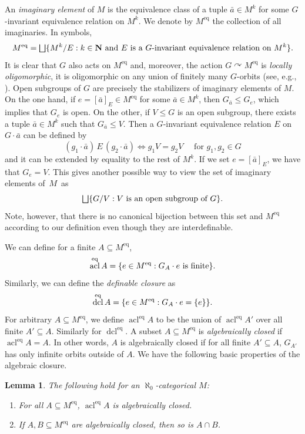 \documentclass[JEP,XML,SOM,Unicode,published]{cedram}
\let\oldbigsqcup\bigsqcup
\renewcommand{\bigsqcup}{\mathop{\textstyle\oldbigsqcup}\displaylimits}
\let\actson\curvearrowright
\let\sub\subseteq
\theoremstyle{plain}
\newtheorem{lemma}[theorem]{Lemma}
\theoremstyle{definition}
\newcommand{\N}{{\mathbf N}}
\DeclareMathOperator{\acl}{acl}
\DeclareMathOperator{\dcl}{dcl}
\DeclarePairedDelimiter\set{\{}{\}}
\newcommand{\eq}{^{\mathrm{eq}}}
\renewcommand{\And}{\text{ and }}
\newcommand{\eqrel}[1]{\,#1\,}
\begin{document}
An \emph{imaginary element} of $M$ is the equivalence class of a tuple $\bar a \in M^k$ for some $G$-invariant equivalence relation on $M^k$. We denote by $M\eq$ the collection of all imaginaries. In symbols,
\begin{equation*}
M\eq = \bigsqcup \set{M^k / E : k \in \N \And E \text{ is a $G$-invariant equivalence relation on } M^k}.
\end{equation*}
It is clear that $G$ also acts on $M\eq$ and, moreover, the action $G \actson M\eq$ is \emph{locally oligomorphic}, \ie it is oligomorphic on any union of finitely many $G$-orbits (see, e.g., \cite[Th.\,2.4]{Tsankov2012}). Open subgroups of $G$ are precisely the stabilizers of imaginary elements of $M$. On the one hand, if $e = [\bar a]_E \in M\eq$ for some $\bar a \in M^k$, then $G_{\bar a} \leq G_e$, which implies that $G_e$ is open. On the other, if $V \leq G$ is an open subgroup, there exists a tuple $\bar a \in M^k$ such that $G_{\bar a} \leq V$. Then a $G$-invariant equivalence relation $E$ on $G \cdot \bar a$ can be defined by
\begin{equation}
\label{eq:def-imaginary-eqrel}
(g_1 \cdot \bar a) \eqrel{E} (g_2 \cdot \bar a) \iff g_1V = g_2V \quad \text{ for } g_1, g_2 \in G
\end{equation}
and it can be extended by equality to the rest of $M^k$. If we set $e = [\bar a]_E$, we have that $G_e = V$. This gives another possible way to view the set of imaginary elements of~$M$~as
\begin{equation*}
\bigsqcup \set{G/V : V \text{ is an open subgroup of } G}.
\end{equation*}
Note, however, that there is no canonical bijection between this set and $M\eq$ according to our definition even though they are interdefinable.

We can define for a finite $A \sub M\eq$,
\begin{equation*}
\acl\eq A = \set{e \in M\eq : G_A \cdot e \text{ is finite}}.
\end{equation*}
Similarly, we can define the \emph{definable closure} as
\begin{equation*}
\dcl\eq A = \set{e \in M\eq : G_A \cdot e = \set{e}}.
\end{equation*}
For arbitrary $A \sub M\eq$, we define $\acl\eq A$ to be the union of $\acl\eq A'$ over all finite $A' \sub A$. Similarly for $\dcl\eq$. A subset $A \sub M\eq$ is \emph{algebraically closed} if $\acl\eq A = A$. In other words, $A$ is algebraically closed if for all finite $A' \sub A$, $G_{A'}$ has only infinite orbits outside of $A$.
We have the following basic properties of the algebraic closure.
\begin{lemma}
\label{l:acl}
The following hold for an $\aleph_0$-categorical $M$:
\begin{enumerate}
\item \label{i:acl:1} For all $A \sub M\eq$, $\acl\eq A$ is algebraically closed.
\item \label{i:acl:2} If $A, B \sub M\eq$ are algebraically closed, then so is $A \cap B$.
\end{enumerate}
\end{lemma}
\end{document}
